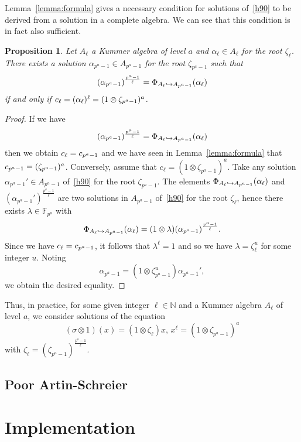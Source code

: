 \documentclass{sig-alternate}
\newtheorem{proposition}{Proposition}
\begin{document}
Lemma~\ref{lemma:formula} gives a necessary condition for solutions of~\eqref{h90}
to be derived from a solution in a complete algebra. We can see that this condition is in fact
also sufficient.
\begin{proposition}
  Let $A_\ell$ a Kummer algebra of level $a$ and $\alpha_\ell\in A_\ell$ for the
  root $\zeta_\ell$. There exists a solution $\alpha_{p^a-1}\in A_{p^a-1}$ for
  the root $\zeta_{p^a-1}$ such that
  \[
    (\alpha_{p^a-1})^{\frac{p^a-1}{\ell}}=\Phi_{A_{\ell}\hookrightarrow A_{p^a-1}}(\alpha_\ell)
  \]
  if and only if $c_\ell = (\alpha_{\ell})^{\ell} = (1\otimes\zeta_{p^a-1})^a$.
\end{proposition}
\begin{proof}
 If we have  
  \[
    (\alpha_{p^a-1})^{\frac{p^a-1}{\ell}}=\Phi_{A_{\ell}\hookrightarrow A_{p^a-1}}(\alpha_\ell)
  \]
  then we obtain $c_{\ell} = c_{p^a-1}$ and we have seen in
  Lemma~\ref{lemma:formula} that $c_{p^a-1}=(\zeta_{p^a-1})^a$. Conversely,
  assume that $c_\ell = (1\otimes\zeta_{p^a-1})^a$. Take any solution
  $\alpha_{p^a-1}'\in A_{p^a-1}$ of~\eqref{h90} for the root $\zeta_{p^a-1}$.
  The elements $\Phi_{A_{\ell}\hookrightarrow A_{p^a-1}}(\alpha_\ell)$ and
  $(\alpha_{p^a-1}')^{\frac{p^a-1}{\ell}}$ are two solutions in $A_{p^a-1}$
  of~\eqref{h90} for the root $\zeta_{\ell}$, hence there exists
  $\lambda\in\mathbb{F}_{p^a}$ with
  \[
    \Phi_{A_{\ell}\hookrightarrow A_{p^a-1}}(\alpha_\ell) =
    (1\otimes\lambda)(\alpha_{p^a-1})^{\frac{p^a-1}{\ell}}.
  \]
  Since we have $c_\ell = c_{p^a-1}$, it follows that $\lambda^\ell = 1$ and
  so we have $\lambda=\zeta_{\ell}^u$ for some integer $u$. Noting
  \[
    \alpha_{p^a-1} = (1\otimes\zeta_{p^a-1}^u)\alpha_{p^a-1}',
  \]
  we obtain the desired equality.
\end{proof}

Thus, in practice, for some given integer
$\ell\in\mathbb{N}$ and a Kummer algebra $A_\ell$ of level $a$, we consider solutions of the
equation
\begin{equation}
  \tag{H90$^\star$}
  (\sigma\otimes1)(x) = (1\otimes\zeta_\ell)x,\,x^\ell =
  (1\otimes\zeta_{p^a-1})^a
  \label{h90s}
\end{equation}
with $\zeta_\ell=(\zeta_{p^a-1})^{\frac{p^a-1}{\ell}}$.

\subsection{Poor Artin-Schreier}




\section{Implementation}
\label{sec:implementation}



\end{document}
